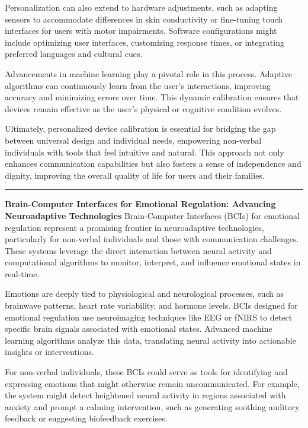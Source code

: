 \documentclass[12pt, research paper]{report}
\begin{document}
	\noindent Personalization can also extend to hardware adjustments, such as adapting sensors to accommodate differences in skin conductivity or fine-tuning touch interfaces for users with motor impairments. Software configurations might include optimizing user interfaces, customizing response times, or integrating preferred languages and cultural cues.
	\bigskip 
	
	\noindent Advancements in machine learning play a pivotal role in this process. Adaptive algorithms can continuously learn from the user’s interactions, improving accuracy and minimizing errors over time. This dynamic calibration ensures that devices remain effective as the user’s physical or cognitive condition evolves.
	\bigskip 
	
	\noindent Ultimately, personalized device calibration is essential for bridging the gap between universal design and individual needs, empowering non-verbal individuals with tools that feel intuitive and natural. This approach not only enhances communication capabilities but also fosters a sense of independence and dignity, improving the overall quality of life for users and their families.
	
	\noindent \rule{13.85cm}{0.01cm}
	\textbf{Brain-Computer Interfaces for Emotional Regulation: Advancing Neuroadaptive Technologies}
	\newline Brain-Computer Interfaces (BCIs) for emotional regulation represent a promising frontier in neuroadaptive technologies, particularly for non-verbal individuals and those with communication challenges. These systems leverage the direct interaction between neural activity and computational algorithms to monitor, interpret, and influence emotional states in real-time.
	\bigskip 
	
	\noindent Emotions are deeply tied to physiological and neurological processes, such as brainwave patterns, heart rate variability, and hormone levels. BCIs designed for emotional regulation use neuroimaging techniques like EEG or fNIRS to detect specific brain signals associated with emotional states. Advanced machine learning algorithms analyze this data, translating neural activity into actionable insights or interventions.
	\bigskip 
	
	\noindent For non-verbal individuals, these BCIs could serve as tools for identifying and expressing emotions that might otherwise remain uncommunicated. For example, the system might detect heightened neural activity in regions associated with anxiety and prompt a calming intervention, such as generating soothing auditory feedback or suggesting biofeedback exercises.
	\bigskip 
	
\end{document}
